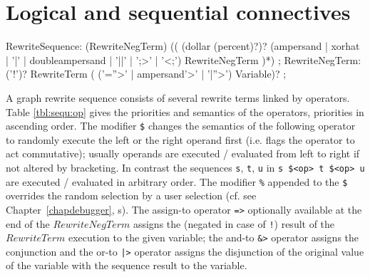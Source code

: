 \section{Logical and sequential connectives}

\makeatletter

\begin{rail}
  RewriteSequence: 
    (RewriteNegTerm) (( (dollar (percent)?)? (ampersand | xorhat | '|' | doubleampersand | '||' | ';>' | '<;') RewriteNegTerm )*)
	;
  RewriteNegTerm: 
    ('!')? RewriteTerm ( ('=''>' | ampersand'>' | '|''>') Variable)?
	;
\end{rail}

A graph rewrite sequence consists of several rewrite terms linked by operators.
Table \ref{tbl:sequ:op} gives the priorities and semantics of the operators, priorities in ascending order.
The modifier \texttt{\$} changes the semantics of the following operator to randomly execute the left or the right operand first (i.e. flags the operator to act commutative);
usually operands are executed / evaluated from left to right if not altered by bracketing.
In contrast the sequences \texttt{s}, \texttt{t}, \texttt{u} in \texttt{s \$<op> t \$<op> u} are executed / evaluated in arbitrary order.
The modifier \texttt{\%} appended to the \texttt{\$} overrides the random selection by a user selection (cf. see Chapter~\ref{chapdebugger}, s).
The assign-to operator \texttt{=>} optionally available at the end of the $RewriteNegTerm$ assigns the (negated in case of \texttt{!}) result of the $RewriteTerm$ execution to the given variable; the and-to \texttt{\&>} operator assigns the conjunction and the or-to \texttt{|>} operator assigns the disjunction of the original value of the variable with the sequence result to the variable.

